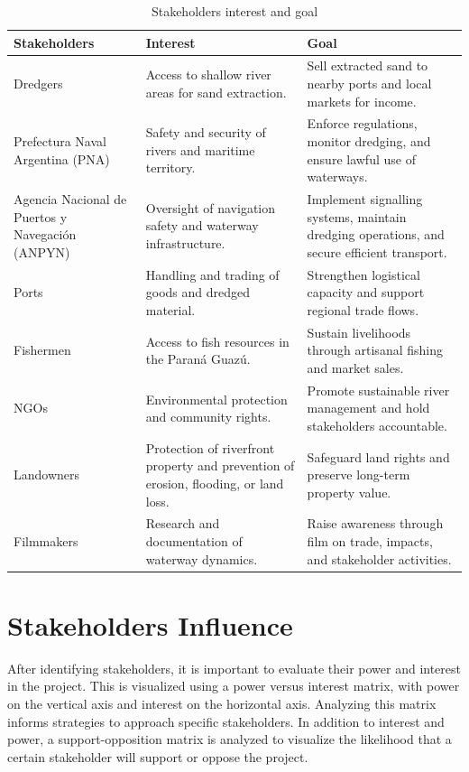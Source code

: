 \begin{table}[H]
\centering
\begin{tabularx}{\linewidth}{p{3.5cm}XX}
\toprule
\textbf{Stakeholders} & \textbf{Interest} & \textbf{Goal} \\
\midrule
Dredgers & Access to shallow river areas for sand extraction. & Sell extracted sand to nearby ports and local markets for income. \\
\midrule
Prefectura Naval Argentina (PNA) & Safety and security of rivers and maritime territory. & Enforce regulations, monitor dredging, and ensure lawful use of waterways. \\
\midrule
Agencia Nacional de Puertos y Navegación (ANPYN) & Oversight of navigation safety and waterway infrastructure. & Implement signalling systems, maintain dredging operations, and secure efficient transport. \\
\midrule
Ports & Handling and trading of goods and dredged material. & Strengthen logistical capacity and support regional trade flows. \\
\midrule
Fishermen & Access to fish resources in the Paraná Guazú. & Sustain livelihoods through artisanal fishing and market sales. \\
\midrule
NGOs & Environmental protection and community rights. & Promote sustainable river management and hold stakeholders accountable. \\
\midrule
Landowners & Protection of riverfront property and prevention of erosion, flooding, or land loss. & Safeguard land rights and preserve long-term property value. \\
\midrule
Filmmakers & Research and documentation of waterway dynamics. & Raise awareness through film on trade, impacts, and stakeholder activities. \\
\bottomrule
\end{tabularx}
\caption{Stakeholders interest and goal}
\label{tab:stakeholders-interests-goals}
\end{table}

\section{Stakeholders Influence}

After identifying stakeholders, it is important to evaluate their power and interest in the project. This is visualized using a power versus interest matrix, with power on the vertical axis and interest on the horizontal axis. Analyzing this matrix informs strategies to approach specific stakeholders. In addition to interest and power, a support-opposition matrix is analyzed to visualize the likelihood that a certain stakeholder will support or oppose the project.

